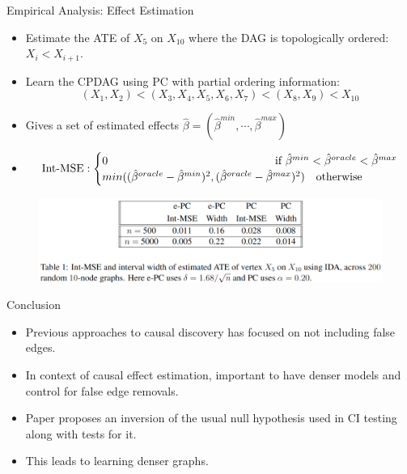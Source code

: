 \documentclass{beamer}
\begin{document}
\begin{frame}{Empirical Analysis: Effect Estimation}
	\begin{itemize}
		\item Estimate the ATE of $ X_5 $ on $ X_{10} $ where the DAG is topologically ordered: $ X_i < X_{i+1} $.
		\item Learn the CPDAG using PC with partial ordering information:
			$$ (X_1, X_2) < (X_3, X_4, X_5, X_6, X_7) < (X_8, X_9) < X_{10} $$
		\item Gives a set of estimated effects $ \hat{\beta} = (\hat{\beta}^{min}, \cdots, \hat{\beta}^{max}) $
		\item $$ \textnormal{Int-MSE}:  \begin{cases}
				0 & \!\!\!\!\!\!\!\!\!\!\!\!\!\!\!\!\!\!\!\!\!\! \textnormal{if } \hat{\beta}^{min} < \hat{\beta}^{oracle} < \hat{\beta}^{max} \\
				min((\hat{\beta}^{oracle} - \hat{\beta}^{min})^2, (\hat{\beta}^{oracle} - \hat{\beta}^{max})^2) & \textnormal{otherwise} \\
						\end{cases} $$
	\end{itemize}
	\begin{figure}
		\centering
		\includegraphics[scale=0.35]{imgs/table1.png}
	\end{figure}
\end{frame}

\begin{frame}{Conclusion}
	\begin{itemize}
		\item Previous approaches to causal discovery has focused on not including false edges.
		\item In context of causal effect estimation, important to have denser models and control for false edge removals.
		\item Paper proposes an inversion of the usual null hypothesis used in CI testing along with tests for it.
		\item This leads to learning denser graphs.
	\end{itemize}
\end{frame}
\end{document}
